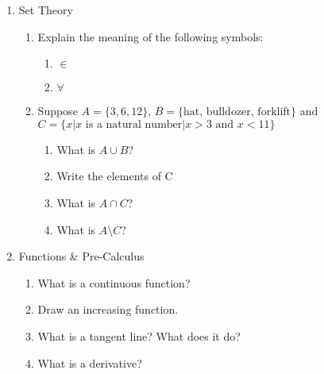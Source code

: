 \documentclass[10pt]{article}
\begin{document}
\begin{enumerate}
\begin{enumerate}
\end{enumerate}

\item Set Theory
\begin{enumerate}
\item Explain the meaning of the following symbols:
\begin{enumerate}
\item $\in$
\item $\forall$
\end{enumerate}
\item Suppose $A=\{3, 6, 12\}$,  $B=\{\text{hat, bulldozer, forklift}\}$ and $C=\{x| x\text{ is a natural number}| x >3 \text{ and } x<11\}$
\begin{enumerate}
\item What is $A \cup B$?
\item Write the elements of C
\item What is $A \cap C$?
\item What is $A\setminus C$?
\end{enumerate}
\end{enumerate}



\item Functions \& Pre-Calculus
\begin{enumerate}
\item What is a continuous function?
\item Draw an increasing function. \\
\newline
\newline
\newline
\item What is a tangent line? What does it do? \\
\item What is a derivative? 
\end{enumerate}


\end{enumerate}
\end{document}
